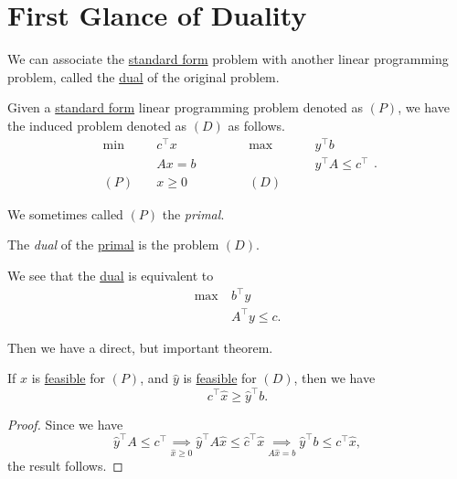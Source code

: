 \section{First Glance of Duality}
We can associate the \hyperref[def:standard-form]{standard form} problem with another linear programming problem, called the \hyperref[def:dual]{dual} of the original problem.
\begin{definition}\label{def:primal-and-dual}
	Given a \hyperref[def:standard-form]{standard form} linear programming problem denoted as \((P)\), we have the induced problem denoted as \((D)\) as follows.
	\[
		\begin{alignedat}{5}
			\min~&c^{\top}x\qquad\qquad &&\max ~ &&y^{\top}b\\
			&Ax = b && &&y^{\top}A\leq c^{\top}\\
			(P)\quad&x\geq  0 &&(D)\quad&&
		\end{alignedat}.
	\]
	\begin{definition}[Primal]\label{def:primal}
		We sometimes called \((P)\) the \emph{primal}.
	\end{definition}

	\begin{definition}[Dual]\label{def:dual}
		The \emph{dual} of the \hyperref[def:primal]{primal} is the problem \((D)\).
	\end{definition}
\end{definition}


\begin{note}
	We see that the \hyperref[def:dual]{dual} is equivalent to
	\begin{align*}
		\max~ & b^{\top}y         \\
		      & A^{\top}y \leq c.
	\end{align*}
\end{note}

Then we have a direct, but important theorem.
\begin{theorem}\label{thm:weak-duality-theorem}
	If \(\hat{x}\) is \hyperref[def:feasible-solution]{feasible} for \((P)\), and \(\hat{y}\) is \hyperref[def:feasible-solution]{feasible} for \((D)\), then we have
	\[
		c^{\top}\hat{x} \geq  \hat{y}^{\top} b.
	\]
\end{theorem}
\begin{proof}
	Since we have
	\[
		\hat{y}^{\top}A\leq c^{\top} \underset{\hat{x}\geq 0}{\implies} \hat{y}^{\top}A \hat{x} \leq \hat{c}^{\top} \hat{x} \underset{A \hat{x} = b}{\implies} \hat{y}^{\top}b \leq c^{\top} \hat{x},
	\]
	the result follows.
\end{proof}

